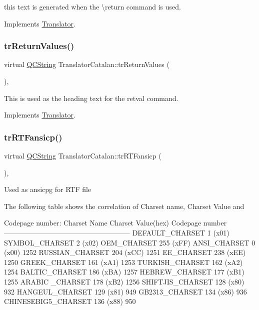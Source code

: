 this text is generated when the \textbackslash{}return command is used. 

Implements \mbox{\hyperlink{class_translator}{Translator}}.

\mbox{\label{class_translator_catalan_a741ccf417977615a1f4373d30a0daa7a}} 
\subsubsection{\texorpdfstring{trReturnValues()}{trReturnValues()}}
{\footnotesize\ttfamily virtual \mbox{\hyperlink{class_q_c_string}{Q\+C\+String}} Translator\+Catalan\+::tr\+Return\+Values (\begin{DoxyParamCaption}{ }\end{DoxyParamCaption})\hspace{0.3cm}{\ttfamily [inline]}, {\ttfamily [virtual]}}

This is used as the heading text for the retval command. 

Implements \mbox{\hyperlink{class_translator}{Translator}}.

\mbox{\label{class_translator_catalan_aabb72d68b8b4454cc1595a10c4914f83}} 
\subsubsection{\texorpdfstring{trRTFansicp()}{trRTFansicp()}}
{\footnotesize\ttfamily virtual \mbox{\hyperlink{class_q_c_string}{Q\+C\+String}} Translator\+Catalan\+::tr\+R\+T\+Fansicp (\begin{DoxyParamCaption}{ }\end{DoxyParamCaption})\hspace{0.3cm}{\ttfamily [inline]}, {\ttfamily [virtual]}}

Used as ansicpg for R\+TF file

The following table shows the correlation of Charset name, Charset Value and 
\begin{DoxyPre}
Codepage number:
Charset Name       Charset Value(hex)  Codepage number
------------------------------------------------------
DEFAULT\_CHARSET           1 (x01)
SYMBOL\_CHARSET            2 (x02)
OEM\_CHARSET             255 (xFF)
ANSI\_CHARSET              0 (x00)            1252
RUSSIAN\_CHARSET         204 (xCC)            1251
EE\_CHARSET              238 (xEE)            1250
GREEK\_CHARSET           161 (xA1)            1253
TURKISH\_CHARSET         162 (xA2)            1254
BALTIC\_CHARSET          186 (xBA)            1257
HEBREW\_CHARSET          177 (xB1)            1255
ARABIC \_CHARSET         178 (xB2)            1256
SHIFTJIS\_CHARSET        128 (x80)             932
HANGEUL\_CHARSET         129 (x81)             949
GB2313\_CHARSET          134 (x86)             936
CHINESEBIG5\_CHARSET     136 (x88)             950
\end{DoxyPre}
 

